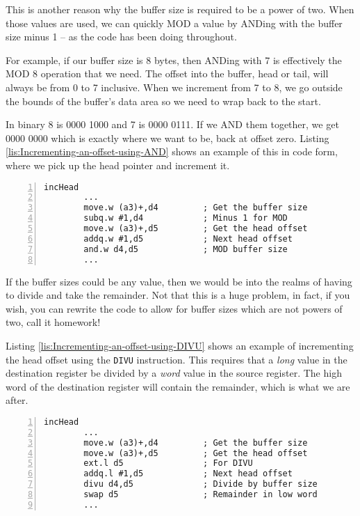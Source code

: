 This is another reason why the buffer size is required to be a power
of two. When those values are used, we can quickly MOD a value by
ANDing with the buffer size minus 1 -- as the code has been doing
throughout. 

For example, if our buffer size is 8 bytes, then ANDing with 7 is
effectively the MOD 8 operation that we need. The offset into the
buffer, head or tail, will always be from 0 to 7 inclusive. When we
increment from 7 to 8, we go outside the bounds of the buffer's data
area so we need to wrap back to the start. 

In binary 8 is 0000 1000 and 7 is 0000 0111. If we AND them together,
we get 0000 0000 which is exactly where we want to be, back at offset
zero. Listing \ref{lis:Incrementing-an-offset-using-AND} shows an
example of this in code form, where we pick up the head pointer and
increment it.

\begin{lstlisting}[caption={Incrementing an offset using AND},label={lis:Incrementing-an-offset-using-AND},numbers=left,showstringspaces=false,tabsize=4]
incHead
        ...
        move.w (a3)+,d4         ; Get the buffer size
        subq.w #1,d4            ; Minus 1 for MOD
        move.w (a3)+,d5         ; Get the head offset
        addq.w #1,d5            ; Next head offset
        and.w d4,d5             ; MOD buffer size
        ...

\end{lstlisting}

If the buffer sizes could be any value, then we would be into the
realms of having to divide and take the remainder. Not that this is
a huge problem, in fact, if you wish, you can rewrite the code to
allow for buffer sizes which are not powers of two, call it homework!

Listing \ref{lis:Incrementing-an-offset-using-DIVU} shows an example
of incrementing the head offset using the \texttt{DIVU} instruction.
This requires that a \emph{long} value in the destination register
be divided by a \emph{word} value in the source register. The high
word of the destination register will contain the remainder, which
is what we are after.

\begin{lstlisting}[caption={Incrementing an offset using DIVU},label={lis:Incrementing-an-offset-using-DIVU},numbers=left,showstringspaces=false,tabsize=4]
incHead
        ...
        move.w (a3)+,d4         ; Get the buffer size
        move.w (a3)+,d5         ; Get the head offset
        ext.l d5                ; For DIVU
        addq.l #1,d5            ; Next head offset
        divu d4,d5              ; Divide by buffer size
        swap d5                 ; Remainder in low word
        ...

\end{lstlisting}

